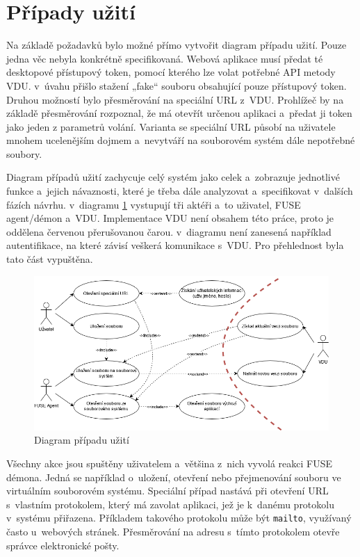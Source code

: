 \section{Případy užití}

Na základě požadavků bylo možné přímo vytvořit diagram případu užití. Pouze jedna věc nebyla konkrétně specifikovaná. Webová aplikace musí předat té desktopové 
přístupový token, pomocí kterého lze volat potřebné API metody VDU. v úvahu přišlo stažení „fake“ souboru obsahující pouze přístupový token. Druhou možností bylo
přesměrování na speciální URL z VDU. Prohlížeč by na základě přesměrování rozpoznal, že má otevřít určenou aplikaci a předat ji token jako jeden z
parametrů volání. Varianta se speciální URL působí na uživatele mnohem ucelenějším dojmem a nevytváří na souborovém systém dále nepotřebné soubory.

Diagram případů užití zachycuje celý systém jako celek a zobrazuje jednotlivé funkce a jejich návaznosti, které je třeba dále analyzovat a specifikovat v dalších
fázích návrhu. v diagramu \ref{fig:use_case} vystupují tři aktéři a to uživatel, FUSE agent/démon a VDU. Implementace VDU není obsahem této práce, proto je oddělena červenou
přerušovanou čarou. v diagramu není zanesená například autentifikace, na které závisí veškerá komunikace s VDU. Pro přehlednost byla tato část vypuštěna.

\begin{figure}[h]
    \centering    
    \includegraphics[width=1\linewidth]{other-fig/use_case_diagram.png}
    \caption{Diagram případu užití}
    \label{fig:use_case}
\end{figure}


Všechny akce jsou spuštěny uživatelem a většina z nich vyvolá reakci FUSE démona. Jedná se například o uložení, otevření nebo přejmenování souboru ve virtuálním souborovém
systému. Speciální případ nastává při otevření URL s vlastním protokolem, který má zavolat aplikaci, jež je k danému protokolu v systému přiřazena. Příkladem takového
protokolu může být \texttt{mailto}, využívaný často u webových stránek. Přesměrování na adresu s tímto protokolem otevře správce elektronické pošty. 

